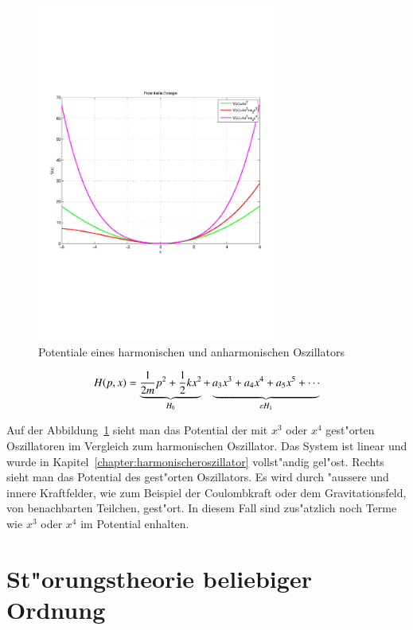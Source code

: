 \begin{refsection}
\begin{figure}	%
\centering
\includegraphics[width=0.7\textwidth]{anharmonisch/images/Potential.pdf}
\caption{Potentiale eines harmonischen und anharmonischen Oszillators
\label{skript:Potentiale}}
\end{figure}

\[
H(p,x)
=
\underbrace{\frac1{2m}p^2+\frac12 kx^2}_{H_0}
+
\underbrace{\vphantom{\frac1{2m}p^2+\frac12 kx^2}
a_3 x^3+a_4 x^4+a_5 x^5+\dotsb}_{\varepsilon H_1}
\]

Auf der Abbildung~\ref{skript:Potentiale} sieht man das Potential der mit
$x^3$ oder $x^4$ gest"orten Oszillatoren im Vergleich zum harmonischen Oszillator.
Das System ist linear und wurde in
Kapitel~\ref{chapter:harmonischeroszillator} vollst"andig gel"ost.
Rechts sieht man das Potential des gest"orten Oszillators.
Es wird durch "aussere und innere Kraftfelder,
wie zum Beispiel der Coulombkraft oder dem Gravitationsfeld, von benachbarten
Teilchen, gest"ort.
In diesem Fall sind zus"atzlich noch Terme wie $x^3$ oder $x^4$ im Potential enhalten.

\section{St"orungstheorie beliebiger Ordnung}
%


\end{refsection}

